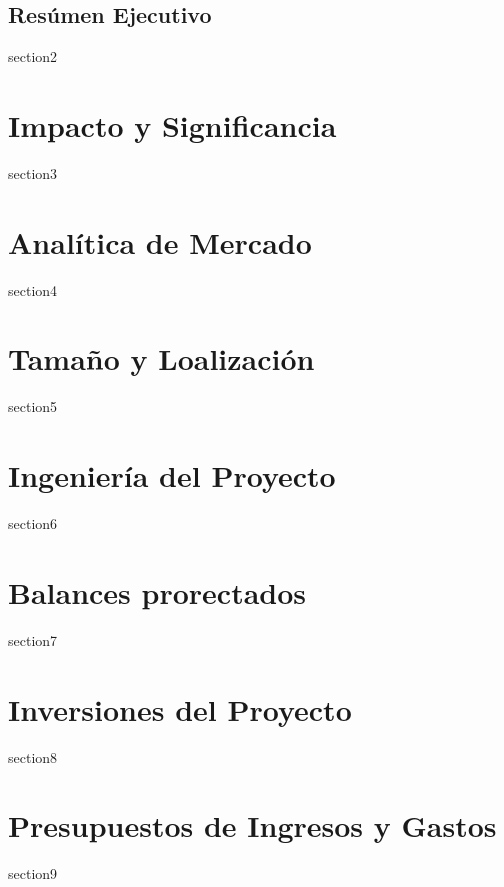 \documentclass[12pt,a4paper,oneside]{book}
\begin{document}
\section{Resúmen Ejecutivo}
{section2}





\chapter{Impacto y Significancia}
{section3}


\chapter{Analítica de Mercado}
{section4}

\chapter{Tamaño y Loalización}
{section5}


\chapter{Ingeniería del Proyecto}
{section6}


\chapter{Balances prorectados}
{section7}



\chapter{Inversiones del Proyecto}
{section8}


\chapter{Presupuestos de Ingresos y Gastos}
{section9}


\end{document}
